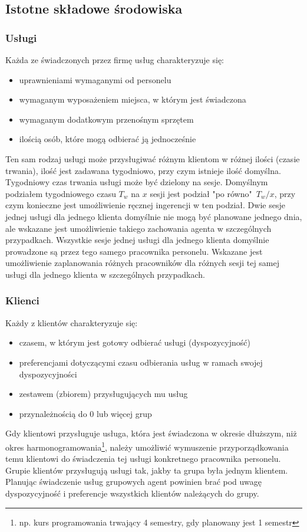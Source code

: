 \subsection{Istotne składowe środowiska}

\subsubsection{Usługi}\label{sssec:uslugi}
Każda ze świadczonych przez firmę usług charakteryzuje się:
\begin{itemize}
	\item{uprawnieniami wymaganymi od personelu}
	\item{wymaganym wyposażeniem miejsca, w którym jest świadczona}
	\item{wymaganym dodatkowym przenośnym sprzętem}
	\item{ilością osób, które mogą odbierać ją jednocześnie}
\end{itemize}
Ten sam rodzaj usługi może przysługiwać różnym klientom w różnej ilości (czasie trwania), ilość jest zadawana tygodniowo, przy czym istnieje ilość domyślna.
Tygodniowy czas trwania usługi może być dzielony na sesje. Domyślnym podziałem tygodniowego czasu \( T_w \) na \( x \) sesji jest podział "po równo"\ \( T_w/x \), przy czym konieczne jest umożliwienie ręcznej ingerencji w ten podział.
Dwie sesje jednej usługi dla jednego klienta domyślnie nie mogą być planowane jednego dnia, ale wskazane jest umożliwienie takiego zachowania agenta w szczególnych przypadkach.
Wszystkie sesje jednej usługi dla jednego klienta domyślnie prowadzone są przez tego samego pracownika personelu. Wskazane jest umożliwienie zaplanowania różnych pracowników dla różnych sesji tej samej usługi dla jednego klienta w szczególnych przypadkach.

\subsubsection{Klienci}\label{sssec:klienci}
Każdy z klientów charakteryzuje się:
\begin{itemize}
	\item{czasem, w którym jest gotowy odbierać usługi (dyspozycyjność)}
	\item{preferencjami dotyczącymi czasu odbierania usług w ramach swojej dyspozycyjności}
	\item{zestawem (zbiorem) przysługujących mu usług}
	\item{przynależnością do 0 lub więcej grup}
\end{itemize}
Gdy klientowi przysługuje usługa, która jest świadczona w okresie dłuższym, niż okres harmonogramowania\footnote{np. kurs programowania trwający 4 semestry, gdy planowany jest 1 semestr}, należy umożliwić wymuszenie przyporządkowania temu klientowi do świadczenia tej usługi konkretnego pracownika personelu. 
Grupie klientów przysługują usługi tak, jakby ta grupa była jednym klientem. Planując świadczenie usług grupowych agent powinien brać pod uwagę dyspozycyjność i preferencje wszystkich klientów należących do grupy.

